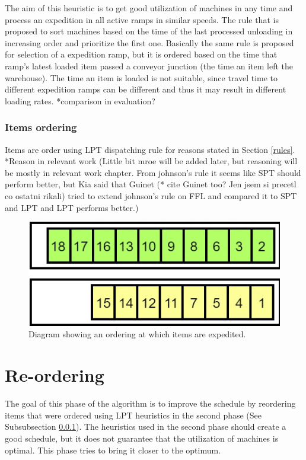 \documentclass{ctuthesis}
\begin{document}
The aim of this heuristic is to get good utilization of machines in any time and process an expedition in all active ramps in similar speeds. The rule that is proposed to sort machines based on the time of the last processed unloading in increasing order and prioritize the first one. 
Basically the same rule is proposed for selection of a expedition ramp, but it is ordered based on the time that ramp's latest loaded item passed a conveyor junction (the time an item left the warehouse). The time an item is loaded is not suitable, since travel time to different expedition ramps can be different and thus it may result in different loading rates. *comparison in evaluation?

\subsubsection{Items ordering}
\label{subsubsec:itemsordering}

Items are order using LPT dispatching rule for reasons stated in Section \ref{rules}. *Reason in relevant work (Little bit mroe will be added later, but reasoning will be mostly in relevant work chapter. From johnson's rule it seems like SPT should perform better, but Kia \cite{kia} said that Guinet (* cite Guinet too? Jen jsem si precetl co ostatni rikali) tried to extend johnson's rule on FFL and compared it to SPT and LPT and LPT performs better.)


\begin{figure}[h]
\includegraphics[width=0.8\linewidth]{order.jpg}
\caption{Diagram showing an ordering at which items are expedited.}
\label{order}
\end{figure}

\section{Re-ordering}

The goal of this phase of the algorithm is to improve the schedule by reordering items that were ordered using LPT heuristics in the second phase (See Subsubsection \ref{subsubsec:itemsordering}). The heuristics used in the second phase should create a good schedule, but it does not guarantee that the utilization of machines is optimal. This phase tries to bring it closer to the optimum.
\end{document}
